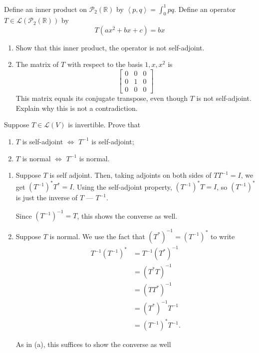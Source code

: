 \documentclass[12 pt, letterpaper]{hmcpset}
\begin{document}
\begin{problem}[14]
	Define an inner product on $\mathcal{P}_{2}(\mathbb{R})$ by $\left < p, q \right > = \int_{0}^{1} pq$. Define an operator $T \in \mathcal{L}(\mathcal{P}_{2}(\mathbb{R}))$ by
	\[
		T(ax^{2} + bx + c) = bx
	\]
	\begin{enumerate}
		\item Show that this inner product, the operator is not self-adjoint.
		\item The matrix of $T$ with respect to the basis $1, x, x^{2}$ is
			\[
				\begin{bmatrix}
					0 & 0 & 0 \\
					0 & 1 & 0 \\
					0 & 0 & 0
				\end{bmatrix}
			\]
			This matrix equals its conjugate transpose, even though $T$ is not self-adjoint. Explain why this is not a contradiction.
	\end{enumerate}
\end{problem}

\pagebreak

\begin{problem}[15]
	Suppose $T \in \mathcal{L}(V)$ is invertible. Prove that
	\begin{enumerate}
		\item $T$ is self-adjoint $\iff$ $T^{-1}$ is self-adjoint;
		\item $T$ is normal $\iff$ $T^{-1}$ is normal.
	\end{enumerate}
\end{problem}

\begin{solution}
	\begin{enumerate}
		\item Suppose $T$ is self adjoint. Then, taking adjoints on both sides of $T T^{-1} = I$, we get $(T^{-1})^{*} T^{*} = I$. Using the self-adjoint property, $(T^{-1})^{*} T = I$, so $(T^{-1})^{*}$ is just the inverse of $T$ ---  $T^{-1}$.

			Since $(T^{-1})^{-1} = T$, this shows the converse as well.
		\item Suppose $T$ is normal. We use the fact that $(T^{*})^{-1} = (T^{-1})^{*}$ to write
			\begin{align*}
				T^{-1} (T^{-1})^{*} & = T^{-1} (T^{*})^{-1} \\
						    & = (T^{*} T)^{-1} \\
						    & = (T T^{*})^{-1} \\
						    & = (T^{*})^{-1} T^{-1} \\
						    & = (T^{-1})^{*} T^{-1}.
			\end{align*}
			
			As in (a), this suffices to show the converse as well
	\end{enumerate}
\end{solution}
\end{document}

